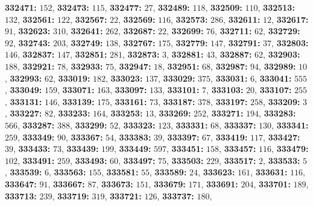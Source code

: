 \textsf{\bfseries 332471:} $152$, \textsf{\bfseries 332473:} $115$, \textsf{\bfseries 332477:} $27$, \textsf{\bfseries 332489:} $118$, \textsf{\bfseries 332509:} $110$, \textsf{\bfseries 332513:} $132$, \textsf{\bfseries 332561:} $122$, \textsf{\bfseries 332567:} $22$, \textsf{\bfseries 332569:} $116$, \textsf{\bfseries 332573:} $286$, \textsf{\bfseries 332611:} $12$, \textsf{\bfseries 332617:} $91$, \textsf{\bfseries 332623:} $310$, \textsf{\bfseries 332641:} $262$, \textsf{\bfseries 332687:} $22$, \textsf{\bfseries 332699:} $76$, \textsf{\bfseries 332711:} $62$, \textsf{\bfseries 332729:} $92$, \textsf{\bfseries 332743:} $203$, \textsf{\bfseries 332749:} $138$, \textsf{\bfseries 332767:} $175$, \textsf{\bfseries 332779:} $147$, \textsf{\bfseries 332791:} $37$, \textsf{\bfseries 332803:} $146$, \textsf{\bfseries 332837:} $147$, \textsf{\bfseries 332851:} $281$, \textsf{\bfseries 332873:} $3$, \textsf{\bfseries 332881:} $43$, \textsf{\bfseries 332887:} $62$, \textsf{\bfseries 332903:} $188$, \textsf{\bfseries 332921:} $78$, \textsf{\bfseries 332933:} $75$, \textsf{\bfseries 332947:} $18$, \textsf{\bfseries 332951:} $68$, \textsf{\bfseries 332987:} $94$, \textsf{\bfseries 332989:} $10$, \textsf{\bfseries 332993:} $62$, \textsf{\bfseries 333019:} $182$, \textsf{\bfseries 333023:} $137$, \textsf{\bfseries 333029:} $375$, \textsf{\bfseries 333031:} $6$, \textsf{\bfseries 333041:} $555$, \textsf{\bfseries 333049:} $159$, \textsf{\bfseries 333071:} $163$, \textsf{\bfseries 333097:} $133$, \textsf{\bfseries 333101:} $7$, \textsf{\bfseries 333103:} $20$, \textsf{\bfseries 333107:} $255$, \textsf{\bfseries 333131:} $146$, \textsf{\bfseries 333139:} $175$, \textsf{\bfseries 333161:} $73$, \textsf{\bfseries 333187:} $378$, \textsf{\bfseries 333197:} $258$, \textsf{\bfseries 333209:} $3$, \textsf{\bfseries 333227:} $82$, \textsf{\bfseries 333233:} $164$, \textsf{\bfseries 333253:} $13$, \textsf{\bfseries 333269:} $252$, \textsf{\bfseries 333271:} $194$, \textsf{\bfseries 333283:} $566$, \textsf{\bfseries 333287:} $388$, \textsf{\bfseries 333299:} $52$, \textsf{\bfseries 333323:} $123$, \textsf{\bfseries 333331:} $68$, \textsf{\bfseries 333337:} $130$, \textsf{\bfseries 333341:} $259$, \textsf{\bfseries 333349:} $90$, \textsf{\bfseries 333367:} $54$, \textsf{\bfseries 333383:} $39$, \textsf{\bfseries 333397:} $67$, \textsf{\bfseries 333419:} $117$, \textsf{\bfseries 333427:} $39$, \textsf{\bfseries 333433:} $73$, \textsf{\bfseries 333439:} $199$, \textsf{\bfseries 333449:} $597$, \textsf{\bfseries 333451:} $158$, \textsf{\bfseries 333457:} $116$, \textsf{\bfseries 333479:} $102$, \textsf{\bfseries 333491:} $259$, \textsf{\bfseries 333493:} $60$, \textsf{\bfseries 333497:} $75$, \textsf{\bfseries 333503:} $229$, \textsf{\bfseries 333517:} $2$, \textsf{\bfseries 333533:} $5$, \textsf{\bfseries 333539:} $6$, \textsf{\bfseries 333563:} $155$, \textsf{\bfseries 333581:} $55$, \textsf{\bfseries 333589:} $24$, \textsf{\bfseries 333623:} $161$, \textsf{\bfseries 333631:} $116$, \textsf{\bfseries 333647:} $91$, \textsf{\bfseries 333667:} $87$, \textsf{\bfseries 333673:} $151$, \textsf{\bfseries 333679:} $171$, \textsf{\bfseries 333691:} $204$, \textsf{\bfseries 333701:} $189$, \textsf{\bfseries 333713:} $239$, \textsf{\bfseries 333719:} $319$, \textsf{\bfseries 333721:} $126$, \textsf{\bfseries 333737:} $180$, 

